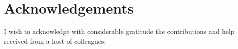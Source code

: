 \chapter*{Acknowledgements}

I wish to acknowledge with considerable gratitude the contributions
and help received from a host of colleagues:
